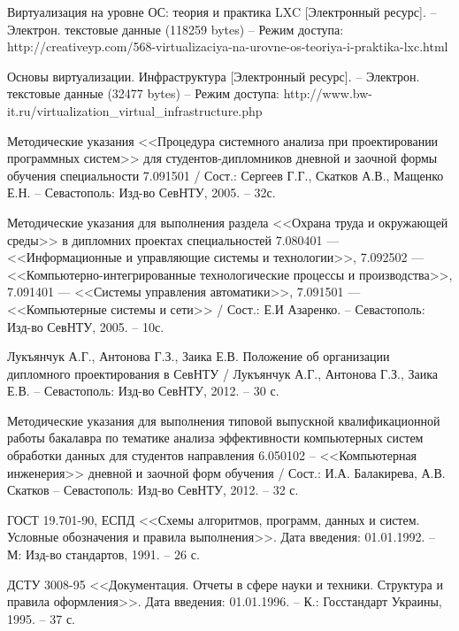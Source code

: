 \begin{thebibliography}{00}
    Виртуализация на уровне ОС: теория и практика LXC
    [Электронный ресурс]. --
    Электрон. текстовые данные (118259 bytes) --
    Режим доступа: http://creativeyp.com/568-virtualizaciya-na-urovne-os-teoriya-i-praktika-lxc.html

    Основы виртуализации. Инфраструктура
    [Электронный ресурс]. --
    Электрон. текстовые данные (32477 bytes) --
    Режим доступа: http://www.bw-it.ru/virtualization\_virtual\_infrastructure.php

    Методические указания <<Процедура системного анализа при проектировании программных систем>>
    для студентов-дипломников дневной и заочной формы обучения специальности 7.091501 /
    Сост.: Сергеев Г.Г., Скатков А.В., Мащенко Е.Н. -- Севастополь:
    Изд-во СевНТУ, 2005. -- 32с.

    Методические указания для выполнения раздела <<Охрана труда и окружающей среды>>
    в дипломних проектах специальностей
    7.080401 --- <<Информационные и управляющие системы и технологии>>,
    7.092502 --- <<Компьютерно-интегрированные технологические процессы и производства>>,
    7.091401 --- <<Системы управления автоматики>>,
    7.091501 --- <<Компьютерные системы и сети>> / Сост.: Е.И Азаренко. -- Севастополь:
    Изд-во СевНТУ, 2005. -- 10с.


\iffalse
{} Лукъянчук А.Г., Антонова Г.З., Заика Е.В. 
    Положение об организации дипломного проектирования в СевНТУ / 
    Лукъянчук А.Г., Антонова Г.З., Заика Е.В. -- Севастополь: 
    Изд-во СевНТУ, 2012. -- 30 с.

    Методические указания для выполнения типовой выпускной 
    квалификационной работы бакалавра по тематике анализа эффективности 
    компьютерных систем обработки данных для студентов направления 
    6.050102 -- <<Компьютерная инженерия>> дневной и заочной форм обучения / 
    Сост.: И.А. Балакирева, А.В. Скатков -- Севастополь: Изд-во СевНТУ, 2012. -- 32 с.

    ГОСТ 19.701-90, ЕСПД <<Схемы алгоритмов, программ, данных и систем. 
    Условные обозначения и правила выполнения>>. 
    Дата введения: 01.01.1992. -- М: Изд-во стандартов, 1991. -- 26 с.

    ДСТУ 3008-95 <<Документация. Отчеты в сфере науки и техники. 
    Структура и правила оформления>>. 
    Дата введения: 01.01.1996. -- К.: Госстандарт Украины, 1995. -- 37 с.


\end{thebibliography}
